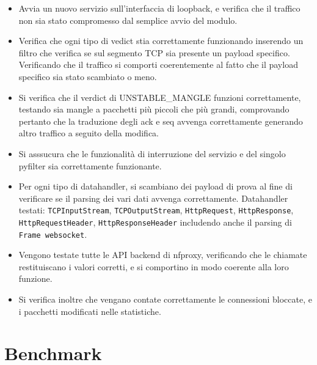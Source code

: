 \begin{itemize}
    \setlength{\itemsep}{5pt}
    \setlength{\parskip}{5pt}
    \item Avvia un nuovo servizio sull'interfaccia di loopback, e verifica che il traffico non sia stato compromesso dal semplice avvio del modulo.
    \item Verifica che ogni tipo di vedict stia correttamente funzionando inserendo un filtro che verifica se sul segmento TCP sia presente un payload specifico.
    Verificando che il traffico si comporti coerentemente al fatto che il payload specifico sia stato scambiato o meno.
    \item Si verifica che il verdict di UNSTABLE\_MANGLE funzioni correttamente, testando sia mangle a pacchetti più piccoli che più grandi, comprovando
    pertanto che la traduzione degli ack e seq avvenga correttamente generando altro traffico a seguito della modifica.
    \item Si asssucura che le funzionalità di interruzione del servizio e del singolo pyfilter sia correttamente funzionante.
    \item Per ogni tipo di datahandler, si scambiano dei payload di prova al fine di verificare se il parsing dei vari dati avvenga correttamente.
    Datahandler testati: \texttt{TCPInputStream}, \texttt{TCPOutputStream}, \texttt{HttpRequest}, \texttt{HttpResponse}, \texttt{HttpRequestHeader},
    \texttt{HttpResponseHeader} includendo anche il parsing di \texttt{Frame websocket}.
    \item Vengono testate tutte le API backend di nfproxy, verificando che le chiamate restituiscano i valori corretti, e si comportino in modo coerente alla loro funzione.
    \item Si verifica inoltre che vengano contate correttamente le connessioni bloccate, e i pacchetti modificati nelle statistiche.
\end{itemize}

\section{Benchmark}


